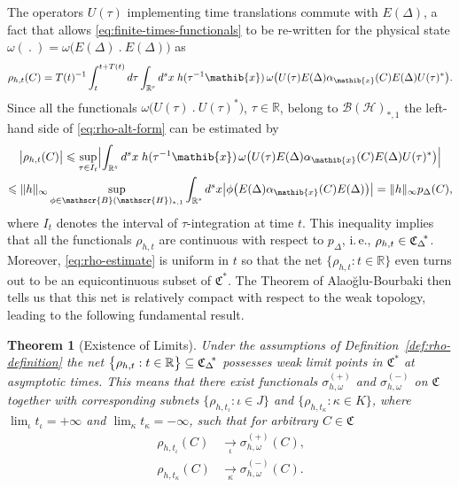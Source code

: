 \documentclass[a4paper,a4paper]{article}
\numberwithin{equation}{section}
\newcommand{\Rbb}{\mathbb{R}}
\newcommand{\Cfrak}{\mathfrak{C}}
\newcommand{\xib}{\mathib{x}}
\newcommand{\Rs}{\mathbb{R}^s}
\newcommand{\BH}{\mathscr{B} ( \mathscr{H} )}
\newcommand{\ED}{E ( \Delta )}
\newcommand{\Cstar}{\mathfrak{C}^*}
\newcommand{\CDstar}{{\mathfrak{C}_\Delta}^{\negthickspace *}}
\newcommand{\aibx}{\alpha_\mathib{x}}
\theoremstyle{definition}
\theoremstyle{plain}
\newtheorem{theorem}[definition]{Theorem}
\theoremstyle{remark}
\newcommand{\bset}[1]{\bigl\{ #1 \bigr\}}
\newcommand{\babs}[1]{\bigl\lvert #1 \bigr\rvert}
\newcommand{\Babs}[1]{\Bigl\lvert #1 \Bigr\rvert}
\newcommand{\norm}[1]{\lVert #1 \rVert}
\newcommand{\pD}{p_\Delta}
\newcommand{\pDx}[1]{p_\Delta ( #1 )}
\begin{document}
  The operators $U ( \tau )$ implementing time translations commute
  with $\ED$, a fact that allows \eqref{eq:finite-times-functionals}
  to be re-written for the physical state $\omega (~.~)= \omega \bigl(
  \ED~.~\ED \bigr)$ as
  \begin{equation}
    \label{eq:rho-alt-form}
    \rho_{h , t} ( C ) = T ( t )^{-1} \int_t^{t + T ( t )} d \tau
    \int_{\Rs} d^s x \; h ( \tau^{-1} \xib ) \, \omega \bigl( U ( \tau
    ) \ED \aibx ( C ) \ED U ( \tau )^* \bigr) \text{.}
  \end{equation}
  Since all the functionals $\omega \bigl( U ( \tau )~.~U ( \tau )^*
  \bigr)$, $\tau \in \Rbb$, belong to $\BH_{*,1}$ the left-hand side
  of \eqref{eq:rho-alt-form} can be estimated by
  \begin{multline}
    \label{eq:rho-estimate}
    \babs{\rho_{h , t} ( C )} \leqslant \sup_{\tau \in I_t}
    \Babs{\int_{\Rs} d^s x \; h ( \tau^{-1} \xib ) \, \omega \bigl( U
    ( \tau ) \ED \aibx ( C ) \ED U ( \tau )^* \bigr)} \\
    \leqslant \norm{h}_\infty \sup_{\phi \in \BH_{*,1}} \int_{\Rs} d^s
    x \babs{\phi \bigl( \ED \aibx ( C ) \ED \bigr)} = \norm{h}_\infty
    \pDx{C} \text{,}
  \end{multline}
  where $I_t$ denotes the interval of $\tau$-integration at time $t$.
  This inequality implies that all the functionals $\rho_{h , t}$ are
  continuous with respect to $\pD$, i.\,e., $\rho_{h , t} \in
  \CDstar$. Moreover, \eqref{eq:rho-estimate} is uniform in $t$ so
  that the net $\bset{\rho_{h , t} : t \in \Rbb}$ even turns out to be
  an equicontinuous subset of $\Cstar$. The Theorem of
  Alao\u{g}lu-Bourbaki \cite[Theorem~8.5.2]{jarchow:1981} then tells
  us that this net is relatively compact with respect to the weak
  topology, leading to the following fundamental result.
  \begin{theorem}[Existence of Limits]
    \label{the:singular-limits}
    Under the assumptions of Definition~\ref{def:rho-definition} the
    net $\bset{\rho_{h , t} : t \in \Rbb} \subseteq \CDstar$ possesses
    weak limit points in $\Cstar$ at asymptotic times. This means that
    there exist functionals $\sigma_{h , \omega}^{( + )}$ and
    $\sigma_{h , \omega}^{( - )}$ on $\Cfrak$ together with
    corresponding subnets $\bset{\rho_{h , t_\iota} : \iota \in J}$
    and $\bset{\rho_{h , t_\kappa} : \kappa \in K}$, where $\lim_\iota
    t_\iota = + \infty$ and $\lim_\kappa t_\kappa = - \infty$, such
    that for arbitrary $C \in \Cfrak$
    \begin{subequations}
      \label{eq:singular-limits}
      \begin{align}
        \rho_{h , t_\iota} ( C ) & \underset{\iota}{\longrightarrow}
        \sigma_{h , \omega}^{( + )} ( C ) \text{,} \\ 
        \rho_{h , t_\kappa} ( C ) & \underset{\kappa}{\longrightarrow}
        \sigma_{h , \omega}^{( - )} ( C ) \text{.}
      \end{align}
    \end{subequations}
  \end{theorem}
  
\end{document}
